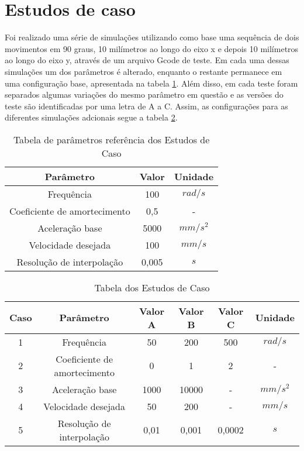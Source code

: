 \section{Estudos de caso}

Foi realizado uma série de simulações utilizando como base uma sequência de dois movimentos em 90 graus,
10 milímetros ao longo do eixo x e depois 10 milímetros ao longo do eixo y, através de um arquivo Gcode de teste.
Em cada uma dessas simulações um dos parâmetros é alterado, enquanto o restante permanece em uma configuração
base, apresentada na tabela \ref{tab:base_params}. Além disso, em cada teste foram separados algumas variações do mesmo
parâmetro em questão e as versões do teste são identificadas por uma letra de A a C.
Assim, as configurações para as diferentes simulações adcionais segue a tabela \ref{tab:sim_params}.

\begin{table}
    \begin{center}
    \caption{Tabela de parâmetros referência dos Estudos de Caso}
    \label{tab:base_params}
    \begin{tabular}{c c c}
        Parâmetro & Valor & Unidade\\ \hline
        Frequência & 100 & $rad/s$\\
        Coeficiente de amortecimento & 0,5 & - \\
        Aceleração base & 5000 & $mm/s^2$ \\
        Velocidade desejada & 100 & $mm/s$ \\
        Resolução de interpolação & 0,005 & $s$ \\ \hline
    \end{tabular}
    \end{center}
\end{table}

\begin{table}
    \begin{center}
    \caption{Tabela dos Estudos de Caso}
    \label{tab:sim_params}
    \begin{tabular}{c c c c c c}
        Caso & Parâmetro & Valor A & Valor B & Valor C & Unidade\\ \hline
        1 & Frequência & 50 & 200 & 500 & $rad/s$\\
        2 & Coeficiente de amortecimento & 0 & 1 & 2 & - \\
        3 & Aceleração base & 1000 & 10000 & - & $mm/s^2$ \\
        4 & Velocidade desejada & 50 & 200 & - & $mm/s$ \\
        5 & Resolução de interpolação & 0,01 & 0,001 & 0,0002 & $s$ \\ \hline
    \end{tabular}
    \end{center}
\end{table}


